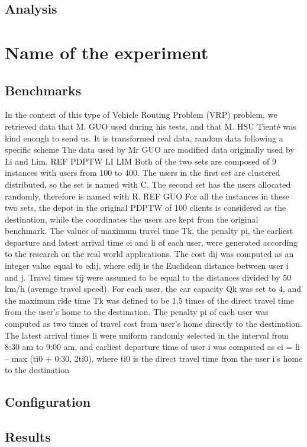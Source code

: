 \documentclass[12pt, a4paper,twoside]{memoir}
\begin{document}
	\subsection{Analysis}
	
	\section{Name of the experiment}
	\subsection{Benchmarks}
	In the context of this type of Vehicle Routing Problem (VRP) problem, we retrieved data that M. GUO used during his tests, and that M. HSU Tienté was kind enough to send us.
	It is transformed real data, random data following a specific scheme 
	The data used by Mr GUO are modified data originally used by Li and Lim.
	REF PDPTW LI LIM
	Both of the two sets are composed of 9 instances with users from 100 to 400. The users in the first set are clustered distributed, so the set is named with C. The second set has the users allocated randomly, therefore is named with R.
	REF GUO
	For all the instances in these two sets, the depot in the original PDPTW of 100 clients is considered as the destination, while the coordinates the users are kept from the original benchmark. The values of maximum travel time Tk, the penalty pi, the earliest departure and latest arrival time ei and li of each user, were generated according to the research on the real world applications. The cost dij was computed as an integer value equal to edij, where edij is the Euclidean distance between user i and j. Travel times tij were assumed to be equal to the distances divided by 50 km/h (average travel speed). For each user, the car capacity Qk was set to 4, and the maximum ride time Tk was defined to be 1.5 times of the direct travel time from the user’s home to the destination. The penalty pi of each user was computed as two times of travel cost from user’s home directly to the destination. The latest arrival times li were uniform randomly selected in the interval from 8:30 am to 9:00 am, and earliest departure time of user i was computed as ei = li – max (ti0 + 0:30, 2ti0), where ti0 is the direct travel time from the user i’s home to the destination
	\subsection{Configuration}
	\subsection{Results}
\end{document}
